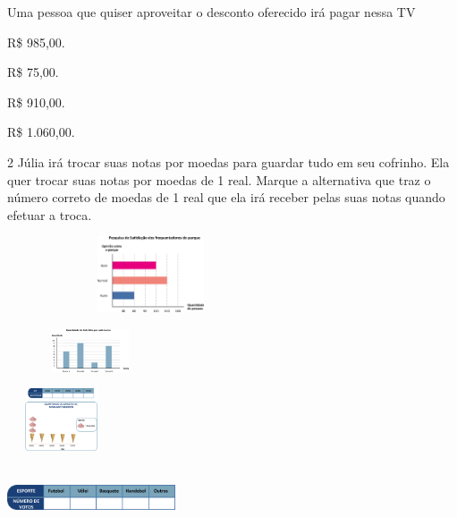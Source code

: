 \begin{multicols}{2}
Uma pessoa que quiser aproveitar o desconto oferecido irá pagar nessa TV

\begin{minipage}{.5\textwidth}
\begin{escolha}
\item
  R\$ 985,00.
\item
  R\$ 75,00.
\item
  R\$ 910,00.
\item
  R\$ 1.060,00.
\end{escolha}
\end{minipage}

\num{2} Júlia irá trocar suas notas por moedas para guardar tudo em seu
cofrinho. Ela quer trocar suas notas por moedas de 1 real. Marque a
alternativa que traz o número correto de moedas de 1 real que ela
irá receber pelas suas notas quando efetuar a troca.


\includegraphics[width=3.34196in,height=0.88341in]{media/image82.png}

\begin{escolha}
\item
\includegraphics[width=1.93350in,height=0.50004in]{media/image83.png}

\item
\includegraphics[width=1.26678in,height=0.72506in]{media/image84.png}

\item
\includegraphics[width=1.95850in,height=0.69173in]{media/image85.png}


\end{escolha}
\end{multicols}
